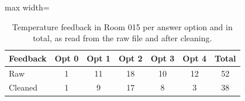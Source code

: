 \begin{table}[ht]
\centering
\begin{adjustbox}{max width=\textwidth}
\begin{tabular}{lcccccc}
\hline
Feedback & Opt 0 & Opt 1 & Opt 2 & Opt 3 & Opt 4 & Total \\
\hline
Raw & 1 & 11 & 18 & 10 & 12 & 52 \\
Cleaned & 1 & 9 & 17 & 8 & 3 & 38 \\
\hline
\end{tabular}
\end{adjustbox}
\caption{Temperature feedback in Room 015 per answer option and in total, as read from the raw file and after cleaning.}
\label{tab:room_015_feedback_counts}
\end{table}
